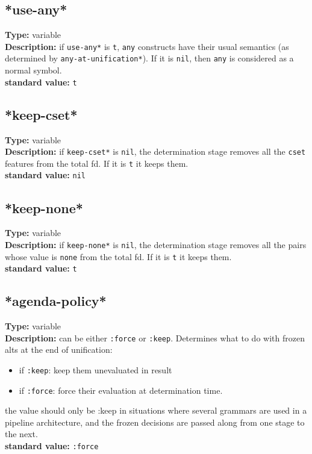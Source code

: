 \documentclass[10pt,a4paper]{report}
\begin{document}
\subsection{*use-any*}
{\bf Type:} variable
\\{\bf Description:} if {\tt *use-any*} is {\tt t}, {\tt any}
constructs have their usual semantics (as determined by
{\tt *any-at-unification*}).  If it is {\tt nil}, then {\tt any} is 
considered as a normal symbol.
\\{\bf standard value:} {\tt t}

\subsection{*keep-cset*}
{\bf Type:} variable
\\{\bf Description:} if {\tt *keep-cset*} is {\tt nil}, the determination
stage removes all the {\tt cset} features from the total fd. If it
is {\tt t} it keeps them.
\\{\bf standard value:} {\tt nil}

\subsection{*keep-none*}
{\bf Type:} variable
\\{\bf Description:} if {\tt *keep-none*} is {\tt nil}, the determination
stage removes all the pairs whose value is {\tt none} from the
total fd. If it is {\tt t} it keeps them.
\\{\bf standard value:} {\tt t}


\subsection{*agenda-policy*}
{\bf Type:} variable
\\{\bf Description:} can be either {\tt :force} or {\tt :keep}.
Determines what to do with frozen alts at the end of unification:
\begin{itemize}
\item if {\tt :keep}:  keep them unevaluated in result

\item if {\tt :force}: force their evaluation at determination time.
\end{itemize}
the value should only be :keep in situations where several grammars are
used in a pipeline architecture, and the frozen decisions are passed along
from one stage to the next.
\\{\bf standard value:} {\tt :force}
\end{document}
